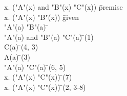 \documentclass{article}
\begin{document}
\begin{proofbox}
\: \forall x. ("A"(x) and "B"(x) \rightarrow "C"(x)) \= \hbox{premise} \\
\: \exists x. ("A"(x) \land "B"(x)) \= \hbox{given} \\
\open
\: "A"(a) \land "B"(a) \= \asm \\
\: "A"(a) and "B"(a) \rightarrow "C"(a) \= \forallelim(1) \\
\: C(a) \= \implieselim(4, 3) \\
\: A(a) \= \andelim(3) \\
\: "A"(a) \land "C"(a) \= \andintro(6, 5) \\
\: \exists x. ("A"(x) \land "C"(x)) \= \existsintro(7) \\
\close
\: \exists x. ("A"(x) \land "C"(x)) \= \existselim(2, 3-8) \\
\end{proofbox}
\end{document}
